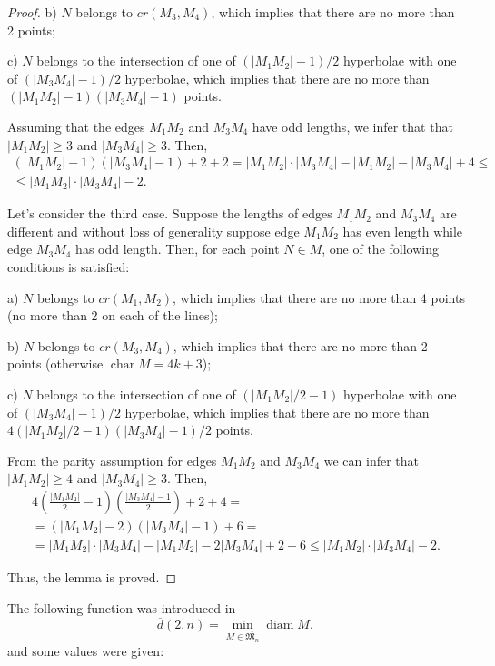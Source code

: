 \documentclass[a4paper,14pt]{article} %
\theoremstyle{plain}
\theoremstyle{definition}
\begin{document}
\begin{proof}
	b) $N$ belongs to $cr(M_3,M_4)$, which implies that there are no more than 2 points;

	c) $N$ belongs to the intersection of one of $(|M_1 M_2|-1)/2$ hyperbolae with one of $(|M_3M_4|-1)/2$ hyperbolae, which implies that there are no more than $(|M_1 M_2|-1)(|M_3 M_4|-1)$ points.

	Assuming that the edges $M_1M_2$ and $M_3M_4$ have odd lengths,
	we infer that that $|M_1M_2|\geq3$ and $|M_3M_4|\geq3$.
	Then,
	\begin{multline}
		(|M_1 M_2| - 1)(|M_3 M_4| - 1) + 2 + 2
		=
		|M_1 M_2| \cdot |M_3 M_4| - |M_1 M_2| - |M_3 M_4| + 4
		\leq \\
		\leq |M_1 M_2| \cdot |M_3 M_4| - 2
		.
	\end{multline}

	Let's consider the third case. Suppose the lengths of edges $M_1M_2$ and $M_3M_4$ are different and without loss of generality suppose edge $M_1M_2$ has even length while edge $M_3 M_4$ has odd length.
	Then, for each point $N\in M$, one of the following conditions is satisfied:

	a) $N$ belongs to $cr(M_1, M_2)$, which implies that there are no more than 4 points (no more than 2 on each of the lines);

	b) $N$ belongs to $cr(M_3,M_4)$, which implies that there are no more than 2 points (otherwise $\operatorname{char} M = 4k+3$);

	c) $N$ belongs to the intersection of one of $(|{M_1 M_2}|/2-1)$ hyperbolae with one of $(|M_3 M_4|-1)/2$ hyperbolae, which implies that there are no more than $4(|M_1 M_2|/2-1)(|M_3 M_4|-1)/2$ points.

	From the parity assumption for edges $M_1 M_2$ and $M_3 M_4$
	we can infer that $|M_1 M_2|\geq4$ and $|M_3M_4|\geq3$.
	Then,
	\begin{multline}
		4\left(\frac{|M_1 M_2|}{2} - 1\right) \left(\frac{|M_3 M_4| - 1}{2}\right) + 2 + 4
		=
		\\=
		(|M_1 M_2| - 2)(|M_3 M_4| - 1) + 6
		=
		\\=
		|M_1 M_2| \cdot |M_3 M_4| - |M_1 M_2| - 2 |M_3 M_4| + 2 + 6
		\leq
		|M_1 M_2| \cdot |M_3 M_4| - 2
		.
	\end{multline}

	Thus, the lemma is proved.
\end{proof}


The following function was introduced in~\cite{kurz2008minimum}
\begin{equation}
	\overline{d}(2,n) = \min_{M\in\overline{\mathfrak{M}_{n}}} \operatorname{diam} M
	,
\end{equation}
and some values were given:
\end{document}
